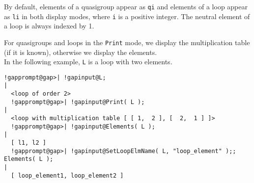 \documentclass[a4paper,11pt]{report}
\begin{document}
{{{By default, elements of a quasigroup appear as \texttt{qi} and elements of a loop appear as \texttt{li} in both display modes, where \texttt{i} is a positive integer. The neutral element of a loop is always indexed by 1.\\
}

 

For quasigroups and loops in the \texttt{Print} mode, we display the multiplication table (if it is known), otherwise we
display the elements. \\


In the following example, \texttt{L} is a loop with two elements. 
\begin{Verbatim}[commandchars=!@|,fontsize=\small,frame=single,label=Example]
  !gapprompt@gap>| !gapinput@L;
|
  <loop of order 2>
  !gapprompt@gap>| !gapinput@Print( L );
|
  <loop with multiplication table [ [ 1,  2 ], [  2,  1 ] ]>
  !gapprompt@gap>| !gapinput@Elements( L );
|
  [ l1, l2 ]
  !gapprompt@gap>| !gapinput@SetLoopElmName( L, "loop_element" );; Elements( L );
|
  [ loop_element1, loop_element2 ]
\end{Verbatim}
 }

 }

  
\end{document}
